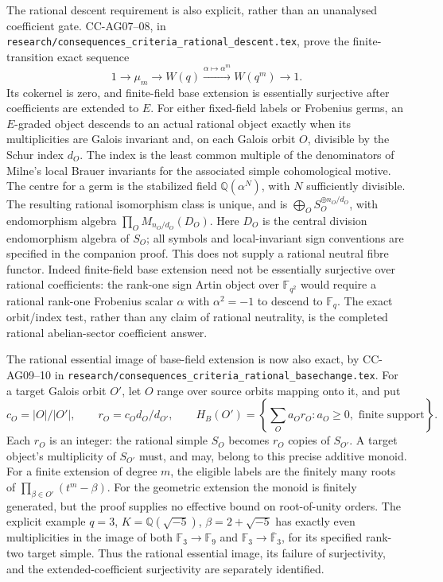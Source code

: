 The rational descent requirement is also explicit, rather than an
unanalysed coefficient gate. CC-AG07--08, in
\texttt{research/consequences\_criteria\_rational\_descent.tex},
prove the finite-transition exact sequence
\[
 1\longrightarrow\mu_m\longrightarrow W(q)
  \xrightarrow{\alpha\mapsto\alpha^m}W(q^m)
  \longrightarrow1.
\]
Its cokernel is zero, and finite-field base extension is
essentially surjective after coefficients are extended to $E$.
For either fixed-field labels or Frobenius germs, an $E$-graded
object descends to an actual rational object exactly when its
multiplicities are Galois invariant and, on each Galois orbit
$O$, divisible by the Schur index $d_O$. The index is the least
common multiple of the denominators of Milne's local Brauer
invariants for the associated simple cohomological motive.
The centre for a germ is the stabilized field
$\mathbb Q(\alpha^N)$, with $N$ sufficiently divisible.
The resulting rational isomorphism class is unique, and is
$\bigoplus_O S_O^{\oplus n_O/d_O}$, with endomorphism algebra
$\prod_O M_{n_O/d_O}(D_O)$. Here $D_O$ is the central division
endomorphism algebra of $S_O$; all symbols and local-invariant
sign conventions are specified in the companion proof.
This does not supply a rational neutral fibre functor.
Indeed finite-field base extension need not be essentially
surjective over rational coefficients: the rank-one sign Artin
object over $\mathbb F_{q^2}$ would require a rational rank-one
Frobenius scalar $\alpha$ with $\alpha^2=-1$ to descend to
$\mathbb F_q$. The exact orbit/index test, rather than any
claim of rational neutrality, is the completed rational
abelian-sector coefficient answer.

The rational essential image of base-field extension is now
also exact, by CC-AG09--10 in
\texttt{research/consequences\_criteria\_rational\_basechange.tex}.
For a target Galois orbit $O'$, let $O$ range over source orbits
mapping onto it, and put
\[
 c_O=|O|/|O'|,\qquad r_O=c_Od_O/d_{O'},\qquad
 H_B(O')=\left\{\sum_O a_Or_O:a_O\ge0,
                         \text{ finite support}\right\}.
\]
Each $r_O$ is an integer: the rational simple $S_O$ becomes
$r_O$ copies of $S_{O'}$. A target object's multiplicity of
$S_{O'}$ must, and may, belong to this precise additive monoid.
For a finite extension of degree $m$, the eligible labels are
the finitely many roots of $\prod_{\beta\in O'}(t^m-\beta)$.
For the geometric extension the monoid is finitely generated,
but the proof supplies no effective bound on root-of-unity
orders. The explicit example $q=3$, $K=\mathbb Q(\sqrt{-5})$,
$\beta=2+\sqrt{-5}$ has exactly even multiplicities in the
image of both $\mathbb F_3\to\mathbb F_9$ and
$\mathbb F_3\to\overline{\mathbb F}_3$, for its specified
rank-two target simple. Thus the rational essential image,
its failure of surjectivity, and the extended-coefficient
surjectivity are separately identified.

